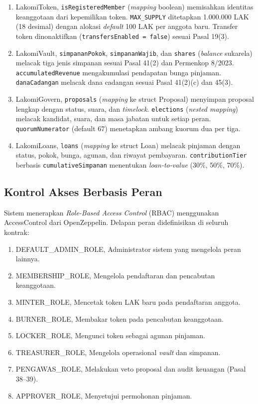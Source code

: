 \begin{enumerate}
	\item LakomiToken, \texttt{isRegisteredMember} (\textit{mapping} boolean) memisahkan identitas keanggotaan dari kepemilikan token. \texttt{MAX\_SUPPLY} ditetapkan 1.000.000 LAK (18 desimal) dengan alokasi \textit{default} 100 LAK per anggota baru. Transfer token dinonaktifkan (\texttt{transfersEnabled = false}) sesuai Pasal 19(3).
	\item LakomiVault, \texttt{simpananPokok}, \texttt{simpananWajib}, dan \texttt{shares} (\textit{balance} sukarela) melacak tiga jenis simpanan sesuai Pasal 41(2) dan Permenkop 8/2023. \texttt{accumulatedRevenue} mengakumulasi pendapatan bunga pinjaman. \texttt{danaCadangan} melacak dana cadangan sesuai Pasal 41(2)(c) dan 45(3).
	\item LakomiGovern, \texttt{proposals} (\textit{mapping} ke struct Proposal) menyimpan proposal lengkap dengan status, suara, dan \textit{timelock}. \texttt{elections} (\textit{nested mapping}) melacak kandidat, suara, dan masa jabatan untuk setiap peran. \texttt{quorumNumerator} (default 67) menetapkan ambang kuorum dua per tiga.
	\item LakomiLoans, \texttt{loans} (\textit{mapping} ke struct Loan) melacak pinjaman dengan status, pokok, bunga, agunan, dan riwayat pembayaran. \texttt{contributionTier} berbasis \texttt{cumulativeSimpanan} menentukan \textit{loan-to-value} (30\%, 50\%, 70\%).
\end{enumerate}

\subsection{Kontrol Akses Berbasis Peran}

Sistem menerapkan \textit{Role-Based Access Control} (RBAC) menggunakan AccessControl dari OpenZeppelin. Delapan peran didefinisikan di seluruh kontrak:

\begin{enumerate}
	\item DEFAULT\_ADMIN\_ROLE, Administrator sistem yang mengelola peran lainnya.
	\item MEMBERSHIP\_ROLE, Mengelola pendaftaran dan pencabutan keanggotaan.
	\item MINTER\_ROLE, Mencetak token LAK baru pada pendaftaran anggota.
	\item BURNER\_ROLE, Membakar token pada pencabutan keanggotaan.
	\item LOCKER\_ROLE, Mengunci token sebagai agunan pinjaman.
	\item TREASURER\_ROLE, Mengelola operasional \textit{vault} dan simpanan.
	\item PENGAWAS\_ROLE, Melakukan veto proposal dan audit keuangan (Pasal 38--39).
	\item APPROVER\_ROLE, Menyetujui permohonan pinjaman.
\end{enumerate}

